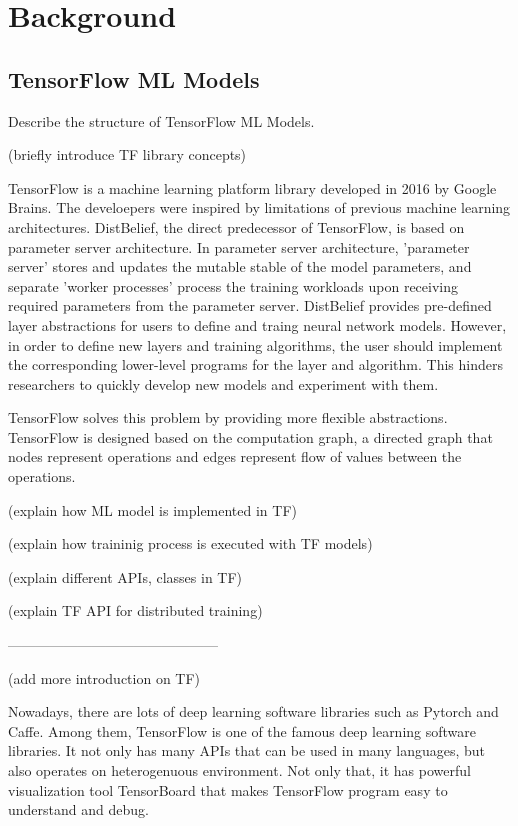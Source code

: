 \section{Background}\label{sec:background}
\subsection{TensorFlow ML Models}
Describe the structure of TensorFlow ML Models.

(briefly introduce TF library concepts)

TensorFlow\cite{tensorflow} is a machine learning platform library
developed in 2016 by Google Brains.
The develoepers were inspired by
limitations of previous machine learning architectures.
DistBelief, the direct predecessor of TensorFlow,
is based on parameter server architecture.
In parameter server architecture,
'parameter server' stores and updates the mutable stable of
the model parameters, and separate 'worker processes'
process the training workloads upon receiving required parameters
from the parameter server.
DistBelief provides pre-defined layer abstractions
for users to define and traing neural network models.
However, in order to define new layers and training algorithms,
the user should implement the corresponding lower-level programs
for the layer and algorithm.
This hinders researchers to quickly develop new models
and experiment with them.

TensorFlow solves this problem by providing more flexible abstractions.
TensorFlow is designed based on the computation graph,
a directed graph that nodes represent operations and
edges represent flow of values between the operations.



(explain how ML model is implemented in TF)

(explain how traininig process is executed with TF models)

(explain different APIs, classes in TF)

(explain TF API for distributed training)




---------------------------------------------



(add more introduction on TF)

Nowadays, there are lots of deep learning software libraries
such as Pytorch and Caffe.
Among them, TensorFlow is one of the famous deep learning software libraries.
It not only has many APIs that can be used in many languages,
but also operates on heterogenuous environment\cite{tensorflow}.
Not only that, it has powerful visualization tool TensorBoard
that makes TensorFlow program easy to understand and debug.

